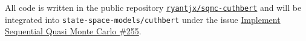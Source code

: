 All code is written in the public repository \href{https://github.com/ryantjx/sqmc-cuthbert}{\texttt{ryantjx/sqmc-cuthbert}} and will be integrated into \texttt{state-space-models/cuthbert} under the issue \href{https://github.com/state-space-models/cuthbert/issues/255}{Implement Sequential Quasi Monte Carlo \#255}.



